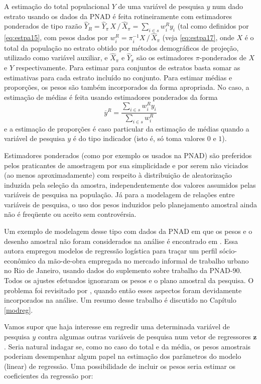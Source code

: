 \documentclass[]{book}
\theoremstyle{definition}
\theoremstyle{definition}
\theoremstyle{definition}
\theoremstyle{remark}
\begin{document}
A estimação do total populacional \(Y\) de uma variável de pesquisa
\(y\) num dado estrato usando os dados da PNAD é feita rotineiramente
com estimadores ponderados de tipo razão
\(\widehat{Y}_{R}=\widehat{Y}_{\pi }\,X\,/\,\widehat{X}_{\pi }=\sum_{i\in s}w_{i}^{R}y_{i}\)
(tal como definidos por \eqref{eq:estpa15}, com pesos dados por
\(w_{i}^{R}=\pi_{i}^{-1}X\,/\,\widehat{X}_{\pi }\) (veja
\eqref{eq:estpa17}, onde \(X\) é o total da população no estrato obtido
por métodos demográficos de projeção, utilizado como variável auxiliar,
e \(\widehat{X}_{\pi}\) e \(\widehat{Y}_{\pi}\) são os estimadores
\(\pi\)-ponderados de \(X\) e \(Y\) respectivamente. Para estimar para
conjuntos de estratos basta somar as estimativas para cada estrato
incluído no conjunto. Para estimar médias e proporções, os pesos são
também incorporados da forma apropriada. No caso, a estimação de médias
é feita usando estimadores ponderados da forma \[
\overline{y}^{R}=\frac{\sum_{i\in s}w_{i}^{R}y_{i}}{\sum_{i\in s}w_{i}^{R}} 
\] e a estimação de proporções é caso particular da estimação de médias
quando a variável de pesquisa \(y\) é do tipo indicador (isto é, só toma
valores \(0\) e \(1\)).

Estimadores ponderados (como por exemplo os usados na PNAD) são
preferidos pelos praticantes de amostragem por sua simplicidade e por
serem não viciados (ao menos aproximadamente) com respeito à
distribuição de aleatorização induzida pela seleção da amostra,
independentemente dos valores assumidos pelas variáveis de pesquisa na
população. Já para a modelagem de relações entre variáveis de pesquisa,
o uso dos pesos induzidos pelo planejamento amostral ainda não é
freqüente ou aceito sem controvérsia.

Um exemplo de modelagem desse tipo com dados da PNAD em que os pesos e o
desenho amostral não foram considerados na análise é encontrado em
\citep{Leote}. Essa autora empregou modelos de regressão logística para
traçar um perfil sócio-econômico da mão-de-obra empregada no mercado
informal de trabalho urbano no Rio de Janeiro, usando dados do
suplemento sobre trabalho da PNAD-90. Todos os ajustes efetuados
ignoraram os pesos e o plano amostral da pesquisa. O problema foi
revisitado por \citep{Pessoa}, quando então esses aspectos foram
devidamente incorporados na análise. Um resumo desse trabalho é
discutido no Capítulo \ref{modreg}.

Vamos supor que haja interesse em regredir uma determinada variável de
pesquisa \(y\) contra algumas outras variáveis de pesquisa num vetor de
regressores \(\mathbf{z}\). Seria natural indagar se, como no caso do
total e da média, os pesos amostrais poderiam desempenhar algum papel na
estimação dos parâmetros do modelo (linear) de regressão. Uma
possibilidade de incluir os pesos seria estimar os coeficientes da
regressão por:
\end{document}
